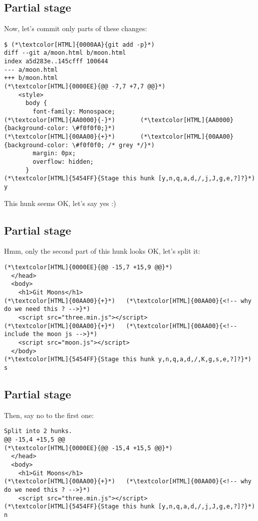 \subsection{Partial stage}
\begin{frame}[fragile]
  \subslidetitle
  Now, let's commit only parts of these changes:
  \begin{lstlisting}
$ (*\textcolor[HTML]{0000AA}{git add -p}*)
diff --git a/moon.html b/moon.html
index a5d283e..145cfff 100644
--- a/moon.html
+++ b/moon.html
(*\textcolor[HTML]{0000EE}{@@ -7,7 +7,7 @@}*)
    <style>
      body {
        font-family: Monospace;
(*\textcolor[HTML]{AA0000}{-}*)       (*\textcolor[HTML]{AA0000}{background-color: \#f0f0f0;}*)
(*\textcolor[HTML]{00AA00}{+}*)       (*\textcolor[HTML]{00AA00}{background-color: \#f0f0f0; /* grey */}*)
        margin: 0px;
        overflow: hidden;
      }
(*\textcolor[HTML]{5454FF}{Stage this hunk [y,n,q,a,d,/,j,J,g,e,?]?}*) y
\end{lstlisting}
  This hunk seems OK, let's say yes :)
\end{frame}

\subsection{Partial stage}
\begin{frame}[fragile]
  \subslidetitle
  Hmm, only the second part of this hunk looks OK, let's split it:
  \begin{lstlisting}
(*\textcolor[HTML]{0000EE}{@@ -15,7 +15,9 @@}*)
  </head>
  <body>
    <h1>Git Moons</h1>
(*\textcolor[HTML]{00AA00}{+}*)   (*\textcolor[HTML]{00AA00}{<!-- why do we need this ? -->}*)
    <script src="three.min.js"></script>
(*\textcolor[HTML]{00AA00}{+}*)   (*\textcolor[HTML]{00AA00}{<!-- include the moon js -->}*)
    <script src="moon.js"></script>
  </body>
(*\textcolor[HTML]{5454FF}{Stage this hunk y,n,q,a,d,/,K,g,s,e,?]?}*) s
\end{lstlisting}
\end{frame}

\subsection{Partial stage}
\begin{frame}[fragile]
  \subslidetitle

  Then, say no to the first one:
  \begin{lstlisting}
Split into 2 hunks.
@@ -15,4 +15,5 @@
(*\textcolor[HTML]{0000EE}{@@ -15,4 +15,5 @@}*)
  </head>
  <body>
    <h1>Git Moons</h1>
(*\textcolor[HTML]{00AA00}{+}*)   (*\textcolor[HTML]{00AA00}{<!-- why do we need this ? -->}*)
    <script src="three.min.js"></script>
(*\textcolor[HTML]{5454FF}{Stage this hunk [y,n,q,a,d,/,j,J,g,e,?]?}*) n
\end{lstlisting}
\end{frame}


